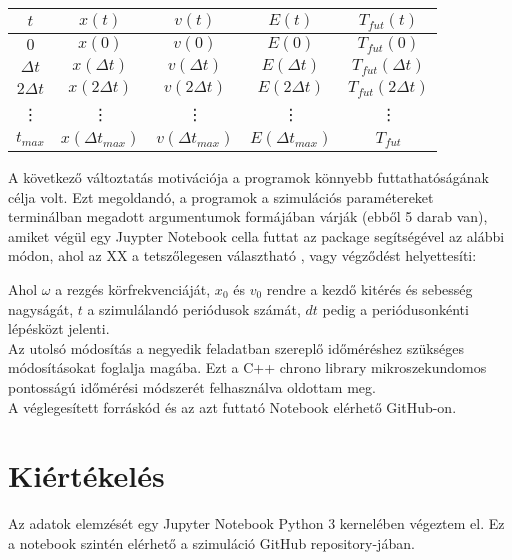 \begin{multicols}{2}
\begin{center}
\begin{tabular}{c|c|c|c|c}
$t$ & $x \left( t \right)$ & $v \left( t \right)$ & $E \left( t \right)$ & $T_{fut} \left( t \right)$ \\
\hline \hline
$0$ & $x \left( 0 \right)$ & $v \left( 0 \right)$  & $E \left( 0 \right)$ & $T_{fut} \left( 0 \right)$ \\
\hline
$\Delta t$ & $x \left( \Delta t \right)$ & $v \left( \Delta t \right)$ & $E \left( \Delta t \right)$ & $T_{fut} \left( \Delta t \right)$ \\
\hline
$2 \Delta t$ & $x \left( 2 \Delta t \right)$ & $v \left( 2 \Delta t \right)$ & $E \left( 2 \Delta t \right)$ & $T_{fut} \left( 2 \Delta t \right)$ \\
\hline
\vdots & \vdots & \vdots & \vdots & \vdots \\
\hline
$t_{max}$ & $x \left( \Delta t_{max} \right)$ & $v \left( \Delta t_{max} \right)$ & $E \left( \Delta t_{max} \right)$ &$T_{fut}$ \\
\hline
\end{tabular}
\end{center}
\label{tab1}
\hfill \break \hfill \break
\noindent A következő változtatás motivációja a programok könnyebb futtathatóságának célja volt. Ezt megoldandó, a programok a szimulációs paramétereket terminálban megadott argumentumok formájában várják (ebből 5 darab van), amiket végül egy Juypter Notebook cella futtat az  package segítségével az alábbi módon, ahol az XX a tetszőlegesen választható , vagy  végződést helyettesíti:
\begin{center}
\end{center}
Ahol $\omega$ a rezgés körfrekvenciáját, $x_{0}$ és $v_{0}$ rendre a kezdő kitérés és sebesség nagyságát, $t$ a szimulálandó periódusok számát, $dt$ pedig a periódusonkénti lépésközt jelenti. \\
Az utolsó módosítás a negyedik feladatban szereplő időméréshez szükséges módosításokat foglalja magába. Ezt a C++ chrono library mikroszekundomos pontosságú időmérési módszerét felhasználva oldottam meg. \\
A véglegesített forráskód és az azt futtató Notebook elérhető GitHub-on\cite{github}.

\section{Kiértékelés}
Az adatok elemzését egy Jupyter Notebook Python 3 kernelében végeztem el. Ez a notebook szintén elérhető a szimuláció GitHub repository-jában\cite{github}.


\end{multicols}
